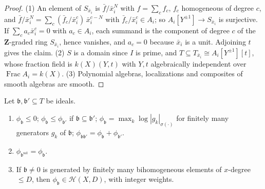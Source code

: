 \begin{proof}
(1) An element of $S_{\bar x_i}$ is $\bar f/\bar x_i^N$ with $f=\sum_cf_c$, $f_c$ homogeneous of degree $c$, and
$\bar f/\bar x_i^N=\sum_c(\bar f_c/\bar x_i^c)\,\bar x_i^{c-N}$ with $\bar f_c/\bar x_i^c\in A_i$; so $A_i[Y^{\pm1}]\to S_{\bar x_i}$ is surjective.
If $\sum_ca_c\bar x_i^c=0$ with $a_c\in A_i$, each summand is the component of degree $c$ of the $\mathbf{Z}$-graded ring
$S_{\bar x_i}$, hence vanishes, and $a_c=0$ because $\bar x_i$ is a unit. Adjoining $t$ gives the claim.
(2) $S$ is a domain since $I$ is prime, and $T\subseteq T_{\bar x_i}\cong A_i[Y^{\pm1}][t]$, whose fraction field is
$k(X)(Y,t)$ with $Y,t$ algebraically independent over $\operatorname{Frac}A_i=k(X)$. (3) Polynomial algebras, localizations and
composites of smooth algebras are smooth.
\end{proof}

\begin{lemma}\label{lem:sg-phi-basic}
\leanok
{}
Let $\mathfrak b,\mathfrak b'\subseteq T$ be ideals.
\begin{enumerate}
\item $\phi_{\mathfrak b}\le0$; $\phi_{\mathfrak b}\le\phi_{\mathfrak b'}$ if $\mathfrak b\subseteq\mathfrak b'$; $\phi_{\mathfrak b}=\max_k\log|g_k|_{\sigma(\cdot)}$ for
finitely many generators $g_k$ of $\mathfrak b$; $\phi_{\mathfrak b\mathfrak b'}=\phi_{\mathfrak b}+\phi_{\mathfrak b'}$.
\item $\phi_{\mathfrak b^{\mathrm{sat}}}=\phi_{\mathfrak b}$.
\item If $\mathfrak b\ne0$ is generated by finitely many bihomogeneous elements of $x$-degree $\le D$, then
$\phi_{\mathfrak b}\in\mathcal H(X,D)$, with integer weights.
\end{enumerate}
\end{lemma}

